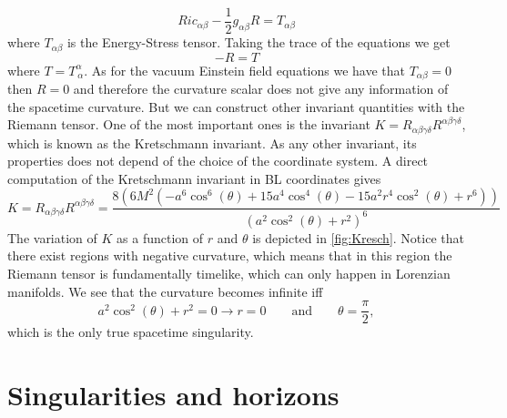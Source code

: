 \begin{equation}
 Ric_{\alpha \beta}-\frac{1}{2} g_{\alpha \beta} R=T_{\alpha \beta}
\end{equation}
where $T_{\alpha \beta}$ is the Energy-Stress tensor. Taking the trace of the equations we get
\begin{equation}
 -R=T
\end{equation}
where $T=T^\alpha_{\,\alpha}$. As for the vacuum Einstein field equations we have that $T_{\alpha \beta}=0$ then $R=0$ and therefore the curvature scalar does not give any information of the spacetime curvature. But we can construct other invariant quantities with the Riemann tensor. One of the most important ones is the invariant $K=R_{\alpha \beta \gamma \delta}R^{\alpha \beta \gamma \delta}$, which is known as the Kretschmann invariant. As any other invariant, its properties does not depend of the choice of the coordinate system. A direct computation of the Kretschmann invariant in \gls{BL} coordinates gives
\begin{equation}
 K=R_{\alpha \beta \gamma \delta}R^{\alpha \beta \gamma \delta}=\frac{8 \left(6 M^2 \left(-a^6 \cos ^6(\theta )+15 a^4 \cos ^4(\theta )-15 a^2 r^4 \cos ^2(\theta )+r^6\right)\right)}{\left(a^2 \cos ^2(\theta )+r^2\right)^6}
\end{equation}
The variation of $K$ as a function of $r$ and $\theta$ is depicted in \cref{fig:Kresch}. Notice that there exist regions with negative curvature, which means that in this region the Riemann tensor is fundamentally timelike, which can only happen in Lorenzian manifolds. We see that the curvature becomes infinite iff
\begin{equation}
a^2 \cos ^2(\theta )+r^2= 0 \rightarrow r=0 \quad \quad \mbox{and} \quad \quad \theta=\frac{\pi}{2},
\end{equation}
which is the only true spacetime singularity.

\section{Singularities and horizons}

